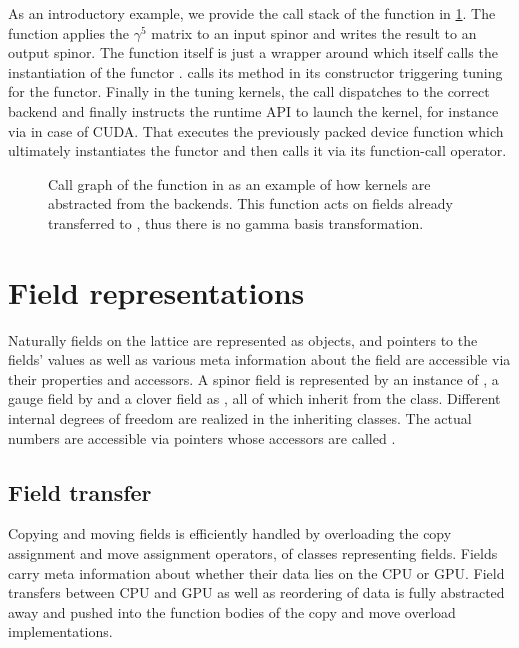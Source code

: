 As an introductory example, we provide the call stack of the function  in \cref{fig:quda:gamma5}. The function applies the $\gamma^5$ matrix to an input spinor and writes the result to an output spinor. The function itself is just a wrapper around  which itself calls the instantiation of the functor .  calls its  method in its constructor triggering tuning for the  functor. Finally in the tuning kernels, the  call dispatches to the correct backend and finally instructs the runtime API to launch the kernel, for instance via  in case of CUDA. That executes the previously packed device function which ultimately instantiates the  functor and then calls it via its function-call operator.
\begin{figure}
  
  \caption{Call graph of the  function in \quda as an example of how kernels are abstracted from the backends. This function acts on fields already transferred to \quda, thus there is no gamma basis transformation.}
  \label{fig:quda:gamma5}
\end{figure}

\section{Field representations}

Naturally fields on the lattice are represented as objects, and pointers to the fields' values as well as various meta information about the field are accessible via their properties and accessors.
A spinor field is represented by an instance of , a gauge field by  and a clover field as , all of which inherit from the  class. Different internal degrees of freedom are realized in the inheriting classes. The actual numbers are accessible via pointers whose accessors are called .

\subsection{Field transfer}

Copying and moving fields is efficiently handled by overloading the copy assignment and move assignment operators,  of classes representing fields.
Fields carry meta information about whether their data lies on the CPU or GPU.
Field transfers between CPU and GPU as well as reordering of data is fully abstracted away and pushed into the function bodies of the copy and move overload implementations.


